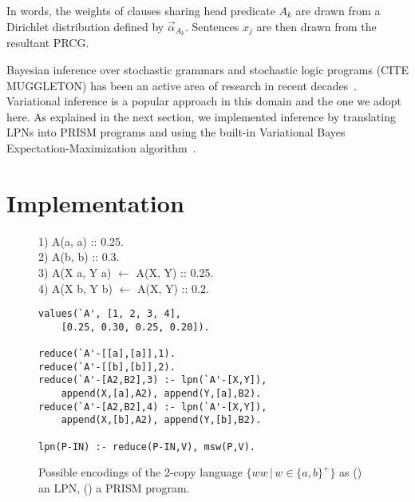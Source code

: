 \documentclass[10pt, twocolumn]{article}
\begin{document}
In words, the weights of clauses sharing head predicate $A_k$ are drawn from a Dirichlet distribution defined by $\vec{\alpha}_{A_k}$. Sentences $x_j$ are then drawn from the resultant PRCG.

Bayesian inference over stochastic grammars
and stochastic logic programs (CITE MUGGLETON) has been an active area of
research in recent decades~\cite{DBLP:conf/emnlp/LiangPJK07,
  goldwater2006contextual, johnson2006adaptor, cussens2001parameter}.
Variational inference is a popular approach in this domain and the one
we adopt here. As explained in the next section, we implemented
inference by translating LPNs into PRISM programs and using the
built-in Variational Bayes Expectation-Maximization
algorithm~\cite{sato2008variational}. 

\section{Implementation \label{sec:implementation}}


\begin{figure}[t]
	\centering
	\begin{minipage}[b]{0.8\linewidth}
1) A(a, a) :: 0.25. \\
2) A(b, b) :: 0.3. \\
3) A(X a, Y a) $\leftarrow$ A(X, Y) :: 0.25. \\
4) A(X b, Y b) $\leftarrow$ A(X, Y) :: 0.2.
		\subcaption{}
		\label{fig:grammar}
	\end{minipage}
	\begin{minipage}[b]{0.8\linewidth}
        \fontsize{9}{10.5}\selectfont\ttfamily
		\begin{verbatim}
values(`A', [1, 2, 3, 4],
    [0.25, 0.30, 0.25, 0.20]).

reduce(`A'-[[a],[a]],1).
reduce(`A'-[[b],[b]],2).
reduce(`A'-[A2,B2],3) :- lpn(`A'-[X,Y]),
    append(X,[a],A2), append(Y,[a],B2).
reduce(`A'-[A2,B2],4) :- lpn(`A'-[X,Y]),
    append(X,[b],A2), append(Y,[b],B2).

lpn(P-IN) :- reduce(P-IN,V), msw(P,V).
		\end{verbatim}
		\subcaption{}
		\label{fig:prism}
	\end{minipage}
	\caption{Possible encodings of the 2-copy language $\{ww\,|\, w \in \{a,b\}^+\}$ as () an LPN, () a PRISM program.}
	\label{fig:copy}
\end{figure}
\end{document}
